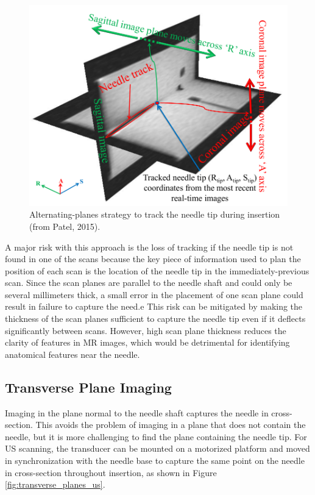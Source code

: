 \begin{figure}[h]
\includegraphics[width=1.0\textwidth]{Fig/chap2/patel_mri_tracking.png}
\caption{Alternating-planes strategy to track the needle tip during insertion (from Patel, 2015\cite{patel_closed-loop_2015}).}
\label{fig:patel_mri_tracking}
\end{figure}

A major risk with this approach is the loss of tracking if the needle tip is not found in one of the scans because the key piece of information used to plan the position of each scan is the location of the needle tip in the immediately-previous scan. Since the scan planes are parallel to the needle shaft and could only be several millimeters thick, a small error in the placement of one scan plane could result in failure to capture the need.e This risk can be mitigated by making the thickness of the scan planes sufficient to capture the needle tip even if it deflects significantly between scans. However, high scan plane thickness reduces the clarity of features in MR images, which would be detrimental for identifying anatomical features near the needle.


\subsection{Transverse Plane Imaging}
Imaging in the plane normal to the needle shaft captures the needle in cross-section. This avoids the problem of imaging in a plane that does not contain the needle, but it is more challenging to find the plane containing the needle tip. For US scanning\cite{carriere_needle_2015,rossa_adaptive_2016,vrooijink_needle_2014}, the transducer can be mounted on a motorized platform and moved in synchronization with the needle base to capture the same point on the needle in cross-section throughout insertion, as shown in Figure \ref{fig:transverse_planes_us}.

